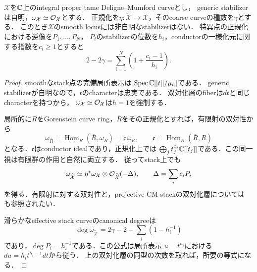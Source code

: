 \documentclass[11pt,a4paper]{ltjsarticle}
\begin{document}
\begin{lemma}[正規化とconductorの次数公式]\label{lem:v7-stack-conductor-degree}
$\mathcal X$を$\mathbb C$上のintegral proper tame Deligne--Mumford curveとし，
generic stabilizerは自明，$\omega_{\mathcal X}\simeq\mathcal O_{\mathcal X}$とする．
正規化を$\eta:\widetilde{\mathcal X}\to\mathcal X$，そのcoarse curveの種数を$\gamma$とする．
このとき$\mathcal X$のsmooth locusには非自明なstabilizerはない．
特異点の正規化における逆像を$P_1,\ldots,P_N$，
$P_i$のstabilizerの位数を$h_i$，conductorの一様化元に関する指数を$c_i\geq1$とすると
\begin{equation}\label{eq:v7-conductor-degree}
 2-2\gamma
 =\sum_{i=1}^N\left(1+\frac{c_i-1}{h_i}\right).
\end{equation}
\end{lemma}
\begin{proof}
smoothなstack点の完備局所表示は$[\operatorname{Spec}\mathbb C[[t]]/\mu_h]$である．
generic stabilizerが自明なので，$t$のcharacterは忠実である．
双対化層のfiberは$dt$と同じcharacterを持つから，
$\omega_{\mathcal X}\simeq\mathcal O_{\mathcal X}$は$h=1$を強制する．

局所的に$R$をGorenstein curve ring，$\overline R$をその正規化とすれば，有限射の双対性から
\[
 \omega_{\overline R}
 =\operatorname{Hom}_R(\overline R,\omega_R)
 =\mathfrak c\,\omega_R,
 \qquad
 \mathfrak c=\operatorname{Hom}_R(\overline R,R)
\]
となる．$\mathfrak c$はconductor idealであり，正規化上では
$\bigoplus_jt_j^{c_j}\mathbb C[[t_j]]$である．この同一視は有限群の作用と自然に両立する．
従ってstack上でも
\[
 \omega_{\widetilde{\mathcal X}}
 \simeq\eta^*\omega_{\mathcal X}\otimes\mathcal O_{\widetilde{\mathcal X}}(-\Delta),
 \qquad \Delta=\sum_i c_iP_i
\]
を得る．有限射に対する双対性と，projective CM stackの双対化層については
\cite[Corollary 2.30, Proposition 2.31]{NironiDuality}も参照されたい．

滑らかなeffective stack curveのcanonical degreeは
\[
 \deg\omega_{\widetilde{\mathcal X}}
 =2\gamma-2+\sum_i(1-h_i^{-1})
\]
であり，$\deg P_i=h_i^{-1}$である．この公式は局所表示
$u=t^{h_i}$における$du=h_it^{h_i-1}dt$から従う．
上の双対化層の同型の次数を取れば，所要の等式になる．
\end{proof}
\end{document}
